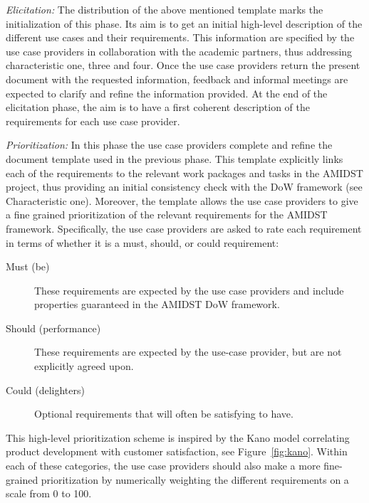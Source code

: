 \emph{Elicitation:} The distribution of the above mentioned template marks the initialization of this phase.  Its aim is
to get an initial high-level description of the different use cases and their requirements. This information are
specified by the use case providers in collaboration with the academic partners, thus addressing characteristic one, three and four.  Once the use case providers return the present document with the requested information, feedback and informal meetings are expected to clarify and refine the information provided.  At the end of the elicitation phase, the aim is to have a first coherent description of the requirements for each use case provider.

 \emph{Prioritization:} In this phase the use case providers complete and refine  the document template used in the
 previous phase. This template explicitly links each of the requirements to the relevant work packages and tasks in the
 AMIDST project, thus providing an initial consistency check with the DoW framework (see Characteristic one). Moreover, the template allows the use case providers to give
 a fine grained prioritization of the relevant requirements for the AMIDST framework.  Specifically, the use case
 providers are asked to rate each requirement in terms of whether it is a must, should, or could requirement:
\begin{description}
\item[Must (be)] These requirements are expected by the use case providers and include properties guaranteed in the AMIDST DoW framework.
\item[Should (performance)] These requirements are expected by the use-case provider, but are not explicitly agreed upon.
\item[Could (delighters)] Optional requirements that will often be satisfying to have.
\end{description}
 This high-level prioritization scheme is inspired by the Kano model
 correlating product development with customer satisfaction, see Figure~\ref{fig:kano}. Within each of these categories, the
 use case providers should also make a more fine-grained prioritization by numerically weighting the different
 requirements on a scale from 0 to 100. 

